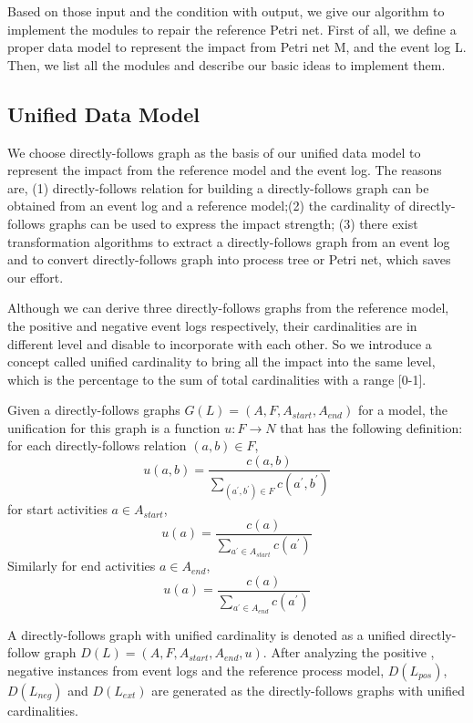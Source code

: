 Based on those input and the condition with output, we give our algorithm to implement the modules to repair the reference Petri net. First of all, we define a proper data model to represent the impact from Petri net M, and the event log L. Then, we list all the modules  and describe our basic ideas to implement them. 
\subsection{Unified Data Model}
We choose directly-follows graph as the basis of our unified data model to represent the impact from the reference model and the event log. The reasons are, (1) directly-follows relation for building a directly-follows graph can be obtained from an event log and a reference model;(2) the cardinality of directly-follows graphs can be used to express the impact strength; (3) there exist transformation algorithms to extract a directly-follows graph from an event log and to convert directly-follows graph into process tree or Petri net, which saves our effort.

Although we can derive three directly-follows graphs from the reference model, the positive and negative event logs respectively, their cardinalities are in different level and disable to incorporate with each other. So we introduce a concept called unified cardinality to bring all the impact into the same level, which is the percentage to the sum of total cardinalities with a range [0-1].
\begin{definition} 
	\label{def:car-unification}
	Given a directly-follows graphs $G(L)  = (A, F , A_{start}, A_{end})$ for a model, the unification for this graph is a function  $u:F\rightarrow N $ that has the following definition: \\
	for each directly-follows relation $(a,b) \in F$,
	\[ u(a,b) = \frac{c(a,b)}{\sum_{(a^\prime,b^\prime) \in F} c(a^\prime,b^\prime)}\]
	for start activities $a \in A_{start}$, 
	\[ u(a) = \frac{c(a)}{\sum_{a^\prime \in A_{start}} c(a^\prime)} \]
	Similarly for end activities $a \in A_{end}$,
	\[ u(a) = \frac{c(a)}{\sum_{a^\prime \in A_{end}} c(a^\prime)} \]
\end{definition}
A directly-follows graph with unified cardinality is denoted as a unified directly-follow graph $D(L)=(A, F , A_{start}, A_{end}, u)$. After analyzing the positive , negative instances from event logs and the reference process model, $D(L_{pos})$, $D(L_{neg})$ and $D(L_{ext})$ are generated as the directly-follows graphs with unified cardinalities.
